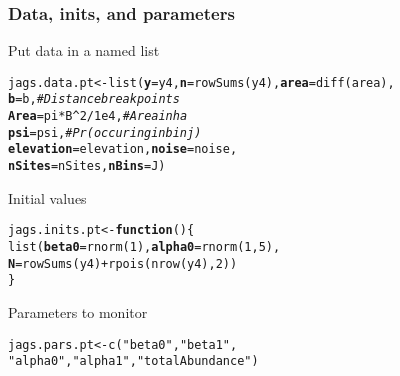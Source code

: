 \documentclass[color=usenames,dvipsnames]{beamer}\usepackage[]{graphicx}\usepackage[]{xcolor}
\makeatletter
\newcommand{\hlnum}[1]{\textcolor[rgb]{0.69,0.494,0}{#1}}%
\newcommand{\hlsng}[1]{\textcolor[rgb]{0.749,0.012,0.012}{#1}}%
\newcommand{\hlcom}[1]{\textcolor[rgb]{0.514,0.506,0.514}{\textit{#1}}}%
\newcommand{\hlopt}[1]{\textcolor[rgb]{0,0,0}{#1}}%
\newcommand{\hldef}[1]{\textcolor[rgb]{0,0,0}{#1}}%
\newcommand{\hlkwa}[1]{\textcolor[rgb]{0,0,0}{\textbf{#1}}}%
\newcommand{\hlkwb}[1]{\textcolor[rgb]{0,0.341,0.682}{#1}}%
\newcommand{\hlkwc}[1]{\textcolor[rgb]{0,0,0}{\textbf{#1}}}%
\newcommand{\hlkwd}[1]{\textcolor[rgb]{0.004,0.004,0.506}{#1}}%
\newenvironment{kframe}{%
 \def\at@end@of@kframe{}%
 \ifinner\ifhmode%
  \def\at@end@of@kframe{\end{minipage}}%
  \begin{minipage}{\columnwidth}%
 \fi\fi%
 \def\FrameCommand##1{\hskip\@totalleftmargin \hskip-\fboxsep
 \colorbox{shadecolor}{##1}\hskip-\fboxsep
     \hskip-\linewidth \hskip-\@totalleftmargin \hskip\columnwidth}%
 \MakeFramed {\advance\hsize-\width
   \@totalleftmargin\z@ \linewidth\hsize
   \@setminipage}}%
 {\par\unskip\endMakeFramed%
 \at@end@of@kframe}
\newenvironment{knitrout}{}{} %
\makeatother
\begin{document}
\begin{frame}[fragile]
  \frametitle{Data, inits, and parameters}
  Put data in a named list
  \vspace{-12pt}
\begin{knitrout}\footnotesize
{}\color{fgcolor}\begin{kframe}
\begin{alltt}
\hldef{jags.data.pt} \hlkwb{<-} \hlkwd{list}\hldef{(}\hlkwc{y}\hldef{=y4,} \hlkwc{n}\hldef{=}\hlkwd{rowSums}\hldef{(y4),} \hlkwc{area}\hldef{=}\hlkwd{diff}\hldef{(area),}
                     \hlkwc{b}\hldef{=b,}              \hlcom{# Distance break points}
                     \hlkwc{Area}\hldef{=pi}\hlopt{*}\hldef{B}\hlopt{^}\hlnum{2}\hlopt{/}\hlnum{1e4}\hldef{,}  \hlcom{# Area in ha}
                     \hlkwc{psi}\hldef{=psi,}          \hlcom{# Pr(occuring in bin j)}
                     \hlkwc{elevation}\hldef{=elevation,} \hlkwc{noise}\hldef{=noise,}
                     \hlkwc{nSites}\hldef{=nSites,} \hlkwc{nBins}\hldef{=J)}
\end{alltt}
\end{kframe}
\end{knitrout}
\pause
\vfill
  Initial values
  \vspace{-12pt}
\begin{knitrout}\footnotesize
{}\color{fgcolor}\begin{kframe}
\begin{alltt}
\hldef{jags.inits.pt} \hlkwb{<-} \hlkwa{function}\hldef{() \{}
    \hlkwd{list}\hldef{(}\hlkwc{beta0}\hldef{=}\hlkwd{rnorm}\hldef{(}\hlnum{1}\hldef{),} \hlkwc{alpha0}\hldef{=}\hlkwd{rnorm}\hldef{(}\hlnum{1}\hldef{,} \hlnum{5}\hldef{),}
         \hlkwc{N}\hldef{=}\hlkwd{rowSums}\hldef{(y4)}\hlopt{+}\hlkwd{rpois}\hldef{(}\hlkwd{nrow}\hldef{(y4),} \hlnum{2}\hldef{))}
\hldef{\}}
\end{alltt}
\end{kframe}
\end{knitrout}
\pause
\vfill
  Parameters to monitor
  \vspace{-12pt}
\begin{knitrout}\small
{}\color{fgcolor}\begin{kframe}
\begin{alltt}
\hldef{jags.pars.pt} \hlkwb{<-} \hlkwd{c}\hldef{(}\hlsng{"beta0"}\hldef{,} \hlsng{"beta1"}\hldef{,}
                  \hlsng{"alpha0"}\hldef{,} \hlsng{"alpha1"}\hldef{,} \hlsng{"totalAbundance"}\hldef{)}
\end{alltt}
\end{kframe}
\end{knitrout}
\end{frame}
\end{document}
